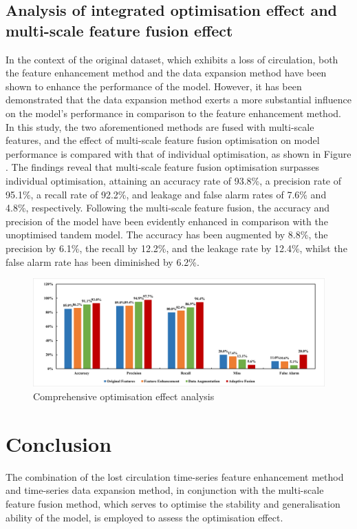 \documentclass[journal,article,submit,pdftex,moreauthors]{Definitions/mdpi}
\begin{document}
\subsection{Analysis of integrated optimisation effect and multi-scale feature fusion effect}

In the context of the original dataset, which exhibits a loss of circulation, both the feature enhancement method and the data expansion method have been shown to enhance the performance of the model. However, it has been demonstrated that the data expansion method exerts a more substantial influence on the model's performance in comparison to the feature enhancement method. In this study, the two aforementioned methods are fused with multi-scale features, and the effect of multi-scale feature fusion optimisation on model performance is compared with that of individual optimisation, as shown in Figure \label{fig:Comprehensive optimisation effect analysis}. The findings reveal that multi-scale feature fusion optimisation surpasses individual optimisation, attaining an accuracy rate of 93.8\%, a precision rate of 95.1\%, a recall rate of 92.2\%, and leakage and false alarm rates of 7.6\% and 4.8\%, respectively. Following the multi-scale feature fusion, the accuracy and precision of the model have been evidently enhanced in comparison with the unoptimised tandem model. The accuracy has been augmented by 8.8\%, the precision by 6.1\%, the recall by 12.2\%, and the leakage rate by 12.4\%, whilst the false alarm rate has been diminished by 6.2\%.

\begin{figure}[h]
    \centering
    \includegraphics[width=1\linewidth]{图片/综合图像.png}
    \caption{Comprehensive optimisation effect analysis}
    \label{fig:Comprehensive optimisation effect analysis}
\end{figure}
\section{Conclusion}
The combination of the lost circulation time-series feature enhancement method and time-series data expansion method, in conjunction with the multi-scale feature fusion method, which serves to optimise the stability and generalisation ability of the model, is employed to assess the optimisation effect.
\end{document}
